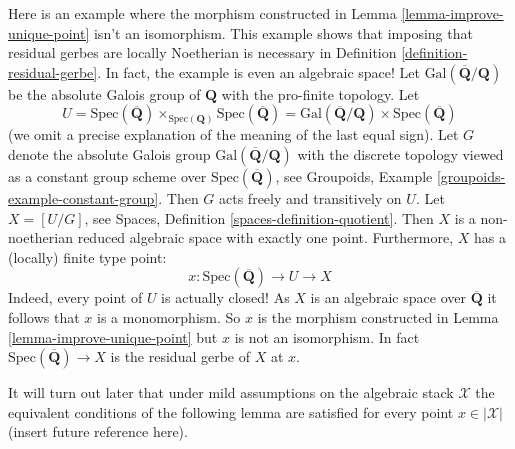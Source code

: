 \begin{example}
\label{example-disctinct}
Here is an example where the morphism constructed in
Lemma \ref{lemma-improve-unique-point}
isn't an isomorphism. This example shows that imposing
that residual gerbes are locally Noetherian is necessary in
Definition \ref{definition-residual-gerbe}.
In fact, the example is even an algebraic space!
Let $\text{Gal}(\overline{\mathbf{Q}}/\mathbf{Q})$ be the absolute
Galois group of $\mathbf{Q}$ with the pro-finite topology.
Let
$$
U =
\text{Spec}(\overline{\mathbf{Q}})
\times_{\text{Spec}(\mathbf{Q})}
\text{Spec}(\overline{\mathbf{Q}}) =
\text{Gal}(\overline{\mathbf{Q}}/\mathbf{Q}) \times
\text{Spec}(\overline{\mathbf{Q}})
$$
(we omit a precise explanation of the meaning of the last equal sign).
Let $G$ denote the absolute Galois group
$\text{Gal}(\overline{\mathbf{Q}}/\mathbf{Q})$ with the discrete
topology viewed as a constant group scheme over
$\text{Spec}(\overline{\mathbf{Q}})$, see
Groupoids, Example \ref{groupoids-example-constant-group}.
Then $G$ acts freely and transitively on $U$.
Let $X = [U/G]$, see
Spaces, Definition \ref{spaces-definition-quotient}.
Then $X$ is a non-noetherian reduced algebraic space with exactly one point.
Furthermore, $X$ has a (locally) finite type point:
$$
x :
\text{Spec}(\overline{\mathbf{Q}}) \longrightarrow
U \longrightarrow X
$$
Indeed, every point of $U$ is actually closed!
As $X$ is an algebraic space over $\overline{\mathbf{Q}}$
it follows that $x$ is a monomorphism. So $x$ is the morphism
constructed in
Lemma \ref{lemma-improve-unique-point}
but $x$ is not an isomorphism. In fact
$\text{Spec}(\overline{\mathbf{Q}}) \to X$ is the residual gerbe of $X$ at $x$.
\end{example}

\noindent
It will turn out later that under mild assumptions on the algebraic stack
$\mathcal{X}$ the equivalent conditions of the following lemma are satisfied
for every point $x \in |\mathcal{X}|$ (insert future reference here).


